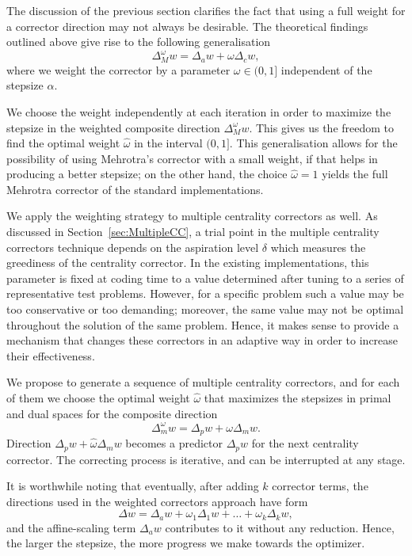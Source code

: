 The discussion of the previous section clarifies the fact that
using a full weight for a corrector direction may not always be
desirable.
The theoretical findings 
outlined above give rise to the following generalisation
\[
  \Delta^\omega_M w = \Delta_a w +\omega\Delta_c w,
\]
where we weight the corrector by a parameter $\omega\in(0,1]$ 
independent of the stepsize $\alpha$.

We choose the weight independently at each iteration in order 
to maximize the stepsize in the weighted composite direction
$\Delta^\omega_M w$.
This gives us the freedom to find the optimal weight 
$\hat\omega$ in the interval $(0,1]$.
%
This generalisation allows for the possibility of using Mehrotra's 
corrector with a small weight, if that helps in producing a better
stepsize; on the other hand, 
the choice $\hat\omega=1$ yields the full Mehrotra corrector of
the standard implementations. 

We apply the weighting strategy to multiple centrality correctors 
as well. 
As discussed in Section~\ref{sec:MultipleCC}, a trial point 
in the multiple centrality correctors technique depends on the
aspiration level
$\delta$ which measures the greediness of the centrality corrector. 
In the existing implementations, this parameter is fixed at coding time 
to a value determined after tuning to a series of representative 
test problems. However, for a specific problem such a value may be 
too conservative or too demanding; moreover, the same value may not 
be optimal throughout the solution of the same problem. 
Hence, it makes sense to provide 
a mechanism that changes these correctors in an adaptive way in order 
to increase their effectiveness.

We propose to generate a sequence of multiple centrality 
correctors, and for each of them we choose the optimal weight 
$\hat \omega$ that  maximizes the stepsizes in primal and dual spaces 
for the composite direction
\[
 \Delta^\omega_m w = \Delta_p w +\omega\Delta_m w.
\]
Direction $\Delta_p w + \hat\omega\Delta_m w$ becomes
a predictor $\Delta_p w$ for the next centrality corrector.
The correcting process
is iterative, and can be interrupted at any stage.

It is worthwhile noting that eventually, after adding $k$ corrector terms, 
the directions used in the weighted correctors approach have form
\[
  \Delta w = \Delta_a w + \omega_1\Delta_1 w + \ldots + \omega_k\Delta_k w,
\]
and the affine-scaling term $\Delta_a w$ contributes to it without any
reduction. Hence, the larger the stepsize, the more progress we make
towards the optimizer.


